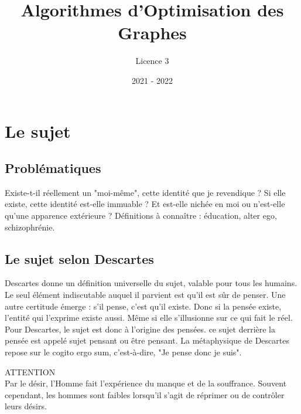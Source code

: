 \documentclass{article}%
\title{Algorithmes d'Optimisation des Graphes}%
\author{Licence 3}%
\date{2021 {-} 2022}%
\begin{document}
%
\normalsize%
\maketitle%
\tableofcontents%
\newpage%
\section{Le sujet}%
\label{sec:Lesujet}%

%
\subsection{Problématiques}%
\label{subsec:Problmatiques}%
Existe{-}t{-}il réellement un "moi{-}même", cette identité que je revendique ?%
\newline%
\newline%
Si elle existe, cette identité est{-}elle immuable ?%
\newline%
\newline%
Et est{-}elle nichée en moi ou n'est{-}elle qu'une apparence extérieure ?%
\newline%
\newline%
Définitions à connaître : éducation, alter ego, schizophrénie.

%
\subsection{Le sujet selon Descartes}%
\label{subsec:LesujetselonDescartes}%
Descartes donne un définition universelle du sujet, valable pour tous les humains. Le seul élément indiscutable auquel il parvient est qu'il est sûr de penser. Une autre certitude émerge : s'il pense, c'est qu'il existe. Donc si la pensée existe, l'entité qui l'exprime existe aussi. Même si elle s'illusionne sur ce qui fait le réel. Pour Descartes, le sujet est donc à l'origine des pensées. ce sujet derrière la pensée est appelé sujet pensant ou être pensant. La métaphysique de Descartes repose sur le cogito ergo sum, c'est{-}à{-}dire, "Je pense donc je suis".

\begin{solution}
{ \footnotesize \textcolor{danger}{ ATTENTION}}
\vspace{3px}
\\ Par le désir, l'Homme fait l'expérience du manque et de la souffrance. Souvent cependant, les hommes sont faibles lorsqu'il s'agit de réprimer ou de contrôler leurs désirs.
\end{solution}

%
\end{document}

